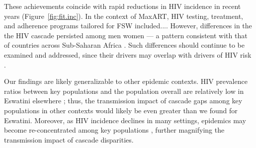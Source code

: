 These achievements coincide with rapid reductions in HIV incidence in recent years
\cite{SHIMS1,SHIMS2,SHIMS3} (Figure~\ref{fig:fit.inc}).
In the context of MaxART, HIV testing, treatment, and adherence programs tailored for FSW included....
However, differences in the the HIV cascade persisted among men \vs women
--- a pattern consistent with that of countries across Sub-Saharan Africa
\cite{SHIMS1,SHIMS2,SHIMS3}.
Such differences should continue to be examined and addressed,
since their drivers may overlap with drivers of HIV risk \cite{Akullian2017,Camlin2019}.
\par
Our findings are likely generalizable to other epidemic contexts.
HIV prevalence ratios between key populations and the population overall
are relatively low in Eswatini \vs elsewhere \cite{Baral2012,Hessou2019};
thus, the transmission impact of cascade gaps among key populations in other contexts
would likely be even greater than we found for Eswatini.
Moreover, as HIV incidence declines in many settings,
epidemics may become re-concentrated among key populations \cite{Brown2019,Garnett2021},
further magnifying the transmission impact of cascade disparities.
\par
